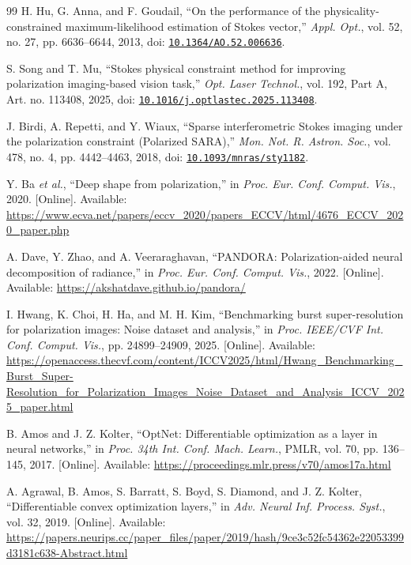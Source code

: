 \documentclass[pdflatex,sn-mathphys-num]{sn-jnl}
\begin{document}
\FloatBarrier
\setlength{\bibsep}{0.5em}
\begin{thebibliography}{99}
 H. Hu, G. Anna, and F. Goudail, ``On the performance of the physicality-constrained maximum-likelihood estimation of Stokes vector,'' \emph{Appl. Opt.}, vol. 52, no. 27, pp. 6636--6644, 2013, doi: \href{https://doi.org/10.1364/AO.52.006636}{\nolinkurl{10.1364/AO.52.006636}}.

 S. Song and T. Mu, ``Stokes physical constraint method for improving polarization imaging-based vision task,'' \emph{Opt. Laser Technol.}, vol. 192, Part A, Art. no. 113408, 2025, doi: \href{https://doi.org/10.1016/j.optlastec.2025.113408}{\nolinkurl{10.1016/j.optlastec.2025.113408}}.

 J. Birdi, A. Repetti, and Y. Wiaux, ``Sparse interferometric Stokes imaging under the polarization constraint (Polarized SARA),'' \emph{Mon. Not. R. Astron. Soc.}, vol. 478, no. 4, pp. 4442--4463, 2018, doi: \href{https://doi.org/10.1093/mnras/sty1182}{\nolinkurl{10.1093/mnras/sty1182}}.

 Y. Ba \emph{et al.}, ``Deep shape from polarization,'' in \emph{Proc. Eur. Conf. Comput. Vis.}, 2020. [Online]. Available: \url{https://www.ecva.net/papers/eccv_2020/papers_ECCV/html/4676_ECCV_2020_paper.php}

 A. Dave, Y. Zhao, and A. Veeraraghavan, ``PANDORA: Polarization-aided neural decomposition of radiance,'' in \emph{Proc. Eur. Conf. Comput. Vis.}, 2022. [Online]. Available: \url{https://akshatdave.github.io/pandora/}

 I. Hwang, K. Choi, H. Ha, and M. H. Kim, ``Benchmarking burst super-resolution for polarization images: Noise dataset and analysis,'' in \emph{Proc. IEEE/CVF Int. Conf. Comput. Vis.}, pp. 24899--24909, 2025. [Online]. Available: \url{https://openaccess.thecvf.com/content/ICCV2025/html/Hwang_Benchmarking_Burst_Super-Resolution_for_Polarization_Images_Noise_Dataset_and_Analysis_ICCV_2025_paper.html}

 B. Amos and J. Z. Kolter, ``OptNet: Differentiable optimization as a layer in neural networks,'' in \emph{Proc. 34th Int. Conf. Mach. Learn.}, PMLR, vol. 70, pp. 136--145, 2017. [Online]. Available: \url{https://proceedings.mlr.press/v70/amos17a.html}

 A. Agrawal, B. Amos, S. Barratt, S. Boyd, S. Diamond, and J. Z. Kolter, ``Differentiable convex optimization layers,'' in \emph{Adv. Neural Inf. Process. Syst.}, vol. 32, 2019. [Online]. Available: \url{https://papers.neurips.cc/paper_files/paper/2019/hash/9ce3c52fc54362e22053399d3181c638-Abstract.html}


\end{thebibliography}
\end{document}
